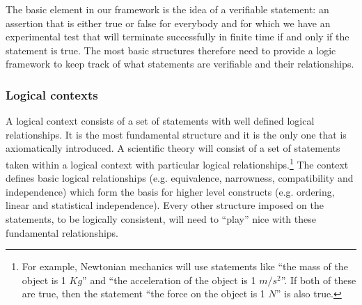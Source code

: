 \documentclass[twocolumn]{article}
\newif\ifextended
\newcommand\fact[2]{\ifextended \emph{#1}. #2 \fi}
\begin{document}
The basic element in our framework is the idea of a verifiable statement: an assertion that is either true or false for everybody and for which we have an experimental test that will terminate successfully in finite time if and only if the statement is true. The most basic structures therefore need to provide a logic framework to keep track of what statements are verifiable and their relationships.

\subsubsection{Logical contexts}

A logical context consists of a set of statements with well defined logical relationships. It is the most fundamental structure and it is the only one that is axiomatically introduced.  A scientific theory will consist of a set of statements taken within a logical context with particular logical relationships.\footnote{For example, Newtonian mechanics will use statements like ``the mass of the object is 1 $Kg$'' and ``the acceleration of the object is 1 $m/s^2$''. If both of these are true, then the statement ``the force on the object is  1 $N$'' is also true.} The context defines basic logical relationships (e.g. equivalence, narrowness, compatibility and independence) which form the basis for higher level constructs (e.g. ordering, linear and statistical independence). Every other structure imposed on the statements, to be logically consistent, will need to ``play'' nice with these fundamental relationships.

\fact{Note on terminology}{The terminology may depart slightly from what logicians may be accustomed to, simply because our aim is different. Namely, our goal is not to study the rule of inference or study what can be formally proven, but simply to keep track of the logical relationships between statements that are assumed to be already given.}

\fact{Statements as primary object} {Every formal theory needs prime objects, elements that will not further be described by the theory. We will take statements, assertion that are either true or false for everybody, as these objects. The formal system will specifically:
\begin{description}
	\item not be propositional; the language of the statements, its syntax, its grammar, will be left unspecified; statements will represent the content regardless of how it is expressed;
	\item be algebraic; operations on statements will not form new statements, but describe relationships within a given set of statements; note that most mathematical structures used in science are algebraic (computer science is a notable exception)
	\item purely formal; the semantic of the statements is not captured, though the semantic will impose logical relationships that will be formally captured
\end{description}}
\end{document}
